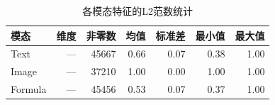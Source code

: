 
\begin{table}[htbp]
  \centering
  \caption{各模态特征的L2范数统计}
  \label{tab:norm_stats}
  \begin{tabular}{lrrrrrr}
    \toprule
    模态 & 维度 & 非零数 & 均值 & 标准差 & 最小值 & 最大值 \\
    \midrule
    Text & --- & 45667 & 0.66 & 0.07 & 0.38 & 1.00 \\
    Image & --- & 37210 & 1.00 & 0.00 & 1.00 & 1.00 \\
    Formula & --- & 45456 & 0.53 & 0.07 & 0.37 & 1.00 \\
    \bottomrule
  \end{tabular}
\end{table}

